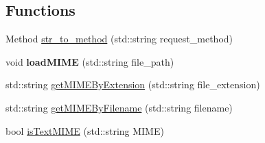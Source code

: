 \subsection*{Functions}
\begin{DoxyCompactItemize}
\item 
Method \hyperlink{namespaceswift_a54d9cafe8eb822e4a2fedef9d724a702}{str\-\_\-to\-\_\-method} (std\-::string request\-\_\-method)
\item 
\hypertarget{namespaceswift_ae335972047e7668cec7201491d257752}{void {\bfseries load\-M\-I\-M\-E} (std\-::string file\-\_\-path)}\label{namespaceswift_ae335972047e7668cec7201491d257752}

\item 
std\-::string \hyperlink{namespaceswift_aed5a07b82de96426b420729d59736292}{get\-M\-I\-M\-E\-By\-Extension} (std\-::string file\-\_\-extension)
\item 
std\-::string \hyperlink{namespaceswift_ac38362ee196781905ade0aab40d11ef3}{get\-M\-I\-M\-E\-By\-Filename} (std\-::string filename)
\item 
bool \hyperlink{namespaceswift_afb665a39ef9f8804a730dae8881b781d}{is\-Text\-M\-I\-M\-E} (std\-::string M\-I\-M\-E)
\end{DoxyCompactItemize}
